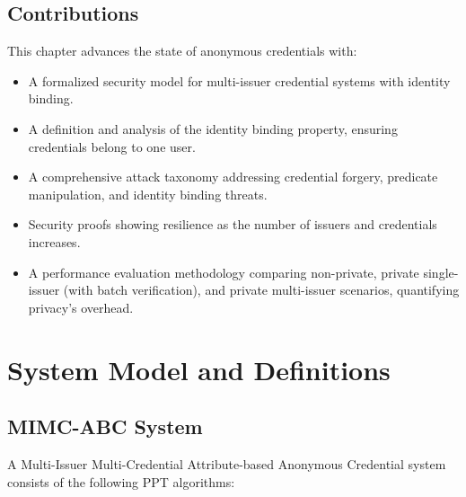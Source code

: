 \subsection{Contributions}
This chapter advances the state of anonymous credentials with:
\begin{itemize}
    \item A formalized security model for multi-issuer credential systems with identity binding.
    \item A definition and analysis of the identity binding property, ensuring credentials belong to one user.
    \item A comprehensive attack taxonomy addressing credential forgery, predicate manipulation, and identity binding threats.
    \item Security proofs showing resilience as the number of issuers and credentials increases.
    \item A performance evaluation methodology comparing non-private, private single-issuer (with batch verification), and private multi-issuer scenarios, quantifying privacy’s overhead.
\end{itemize}


















\section{System Model and Definitions}
\subsection{MIMC-ABC System}
A Multi-Issuer Multi-Credential Attribute-based Anonymous Credential system consists of the following PPT algorithms:

